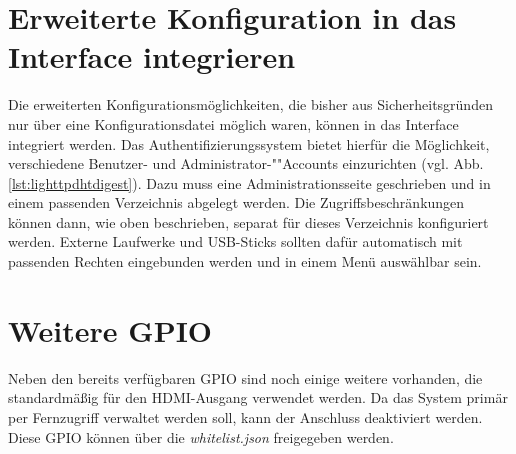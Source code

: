 \documentclass[thesis.tex]{subfiles}
\begin{document}
\section{Erweiterte Konfiguration in das Interface integrieren}
Die erweiterten Konfigurationsmöglichkeiten, die bisher aus Sicherheitsgründen nur über eine Konfigurationsdatei möglich waren, können in das Interface integriert werden. Das Authentifizierungssystem bietet hierfür die Möglichkeit, verschiedene Benutzer- und Ad\-mi\-ni\-stra\-tor-""Accounts einzurichten (vgl. Abb. \ref{lst:lighttpdhtdigest}). Dazu muss eine Administrationsseite geschrieben und in einem passenden Verzeichnis abgelegt werden. Die Zugriffsbeschränkungen können dann, wie oben beschrieben, separat für dieses Verzeichnis konfiguriert werden. Externe Laufwerke und USB-Sticks sollten dafür automatisch mit passenden Rechten eingebunden werden und in einem Menü auswählbar sein.


\section{Weitere GPIO}
Neben den bereits verfügbaren GPIO sind noch einige weitere vorhanden, die standardmäßig für den HDMI-Ausgang verwendet werden. Da das System primär per Fernzugriff verwaltet werden soll, kann der Anschluss deaktiviert werden. Diese GPIO können über die \textit{whitelist.json} freigegeben werden.
\end{document}
